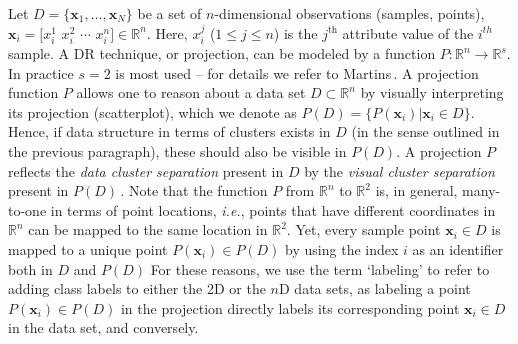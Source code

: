 \documentclass[sagev,Afour,times]{sagej}
\begin{document}
Let $D = \{\mathbf{x}_1,\ldots,\mathbf{x}_N\}$ be a set of $n$-dimensional observations (samples, points), $\mathbf{x}_i = [x^1_i$ $x^2_i$ $\cdots$ $x^n_i] \in \mathbb{R}^n$. Here, $x^j_i$ ($1 \leq j \leq n$) is the $j^{\text{th}}$ attribute value of the $i^{th}$ sample. A DR technique, or projection, can be modeled by a function $P: \mathbb{R}^n \rightarrow \mathbb{R}^s$. In practice $s=2$ is most used -- for details we refer to Martins\,\cite{dr:definition}. 
A projection function $P$ allows one to reason about a data set $D \subset \mathbb{R}^n$ by visually interpreting its projection (scatterplot), which we denote as $P(D) = \{ P(\mathbf{x}_i) | \mathbf{x}_i \in D\}$. Hence, if data structure in terms of clusters exists in $D$ (in the sense outlined in the previous paragraph), these should also be visible in $P(D)$. A projection $P$ reflects the \emph{data cluster separation} present in $D$ by the \emph{visual cluster separation} present in $P(D)$\,\cite{rauber,rauber_2}. Note that the function $P$ from $\mathbb{R}^n$ to $\mathbb{R}^2$ is, in general, many-to-one in terms of point locations, \emph{i.e.}, points that have different coordinates in $\mathbb{R}^n$ can be mapped to the same location in $\mathbb{R}^2$. Yet, every sample point $\mathbf{x}_i \in D$ is mapped to a unique point $P(\mathbf{x}_i) \in P(D)$ by using the index $i$ as an identifier both in $D$ and $P(D)$ For these reasons, we use the term `labeling' to refer to adding class labels to either the 2D or the $n$D data sets, as labeling a point $P(\mathbf{x}_i) \in P(D)$ in the projection directly labels its corresponding point $\mathbf{x}_i \in D$ in the data set, and conversely.
\end{document}
